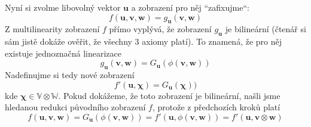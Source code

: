 \documentclass[a5paper,12pt]{amsbook}
\theoremstyle{definition}
\newcommand{\myvec}[1]{\mathbf{#1}}
\newcommand{\myspace}[1]{\mathbb{#1}}
\begin{document}
Nyní si zvolme libovolný vektor $\myvec{u}$ a zobrazení pro něj ``zafixujme``:
\begin{equation*}
f(\myvec{u}, \myvec{v}, \myvec{w}) = g_{\myvec{u}}(\myvec{v}, \myvec{w})
\end{equation*}
Z multilinearity zobrazení $f$ přímo vyplývá, že zobrazení $g_{\myvec{u}}$ je bilineární (čtenář
si sám jistě dokáže ověřit, že všechny 3 axiomy platí). To znamená, že pro něj existuje jednoznačná
linearizace
\begin{equation*}
g_{\myvec{u}}(\myvec{v}, \myvec{w}) = G_{\myvec{u}}(\phi(\myvec{v}, \myvec{w}))
\end{equation*}
Nadefinujme si tedy nové zobrazení
\begin{equation*}
f'(\myvec{u}, \myvec{\chi}) = G_{\myvec{u}}(\myvec{\chi}))
\end{equation*}
kde $\myvec{\chi}\in\myspace{V}\otimes\myspace{W}$. Pokud dokážeme, že toto zobrazení je bilineární,
našli jsme hledanou redukci původního zobrazení $f$, protože z předchozích kroků platí
\begin{equation*}
f(\myvec{u}, \myvec{v}, \myvec{w}) = G_{\myvec{u}}(\phi(\myvec{v}, \myvec{w})) 
  = f'(\myvec{u}, \phi(\myvec{v}, \myvec{w})) = f'(\myvec{u}, \myvec{v}\otimes\myvec{w})
\end{equation*}
\end{document}

